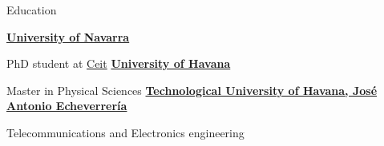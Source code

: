 \begin{rubric}{Education}

\entry*[2023 --  $\cdots$]%
    \textbf{\href{https://www.unav.edu/}{University of Navarra}}
    
    {PhD student at \href{https://www.ceit.es/}{Ceit}}
\entry*[2021 -- 2023]%
    \textbf{\href{https://uh.cu/}{University of Havana}}
    
    {Master in Physical Sciences}
\entry*[2015 -- 2020]%
    \textbf{\href{https://cujae.edu.cu/}{Technological University of Havana, José Antonio Echeverrería}}
    
    {Telecommunications and Electronics engineering}
\end{rubric}